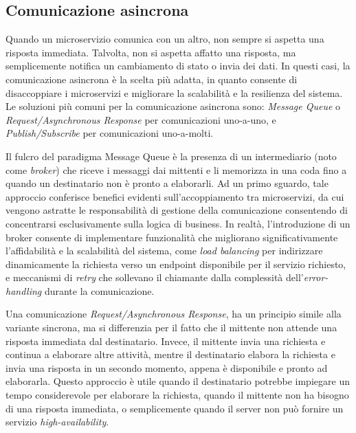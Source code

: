 \subsection{Comunicazione asincrona}
Quando un microservizio comunica con un altro, non sempre si aspetta una risposta immediata. Talvolta, non si aspetta affatto una risposta, ma semplicemente notifica un cambiamento di stato o invia dei dati. In questi casi, la comunicazione asincrona è la scelta più adatta, in quanto consente di disaccoppiare i microservizi e migliorare la scalabilità e la resilienza del sistema.
Le soluzioni più comuni per la comunicazione asincrona sono: \emph{Message Queue} o \emph{Request/Asynchronous Response} per comunicazioni uno-a-uno, e \emph{Publish/Subscribe} per comunicazioni uno-a-molti.

Il fulcro del paradigma Message Queue è la presenza di un intermediario (noto come \emph{broker}) che riceve i messaggi dai mittenti e li memorizza in una coda fino a quando un destinatario non è pronto a elaborarli. Ad un primo sguardo, tale approccio conferisce benefici evidenti sull'accoppiamento tra microservizi, da cui vengono astratte le responsabilità di gestione della comunicazione consentendo di concentrarsi esclusivamente sulla logica di business. In realtà, l'introduzione di un broker consente di implementare funzionalità che migliorano significativamente l'affidabilità e la scalabilità del sistema, come \emph{load balancing} per indirizzare dinamicamente la richiesta verso un endpoint disponibile per il servizio richiesto, e meccanismi di \emph{retry} che sollevano il chiamante dalla complessità dell'\emph{error-handling} durante la comunicazione.

Una comunicazione \emph{Request/Asynchronous Response}, ha un principio simile alla variante sincrona, ma si differenzia per il fatto che il mittente non attende una risposta immediata dal destinatario. Invece, il mittente invia una richiesta e continua a elaborare altre attività, mentre il destinatario elabora la richiesta e invia una risposta in un secondo momento, appena è disponibile e pronto ad elaborarla. Questo approccio è utile quando il destinatario potrebbe impiegare un tempo considerevole per elaborare la richiesta, quando il mittente non ha bisogno di una risposta immediata, o semplicemente quando il server non può fornire un servizio \emph{high-availability}.


